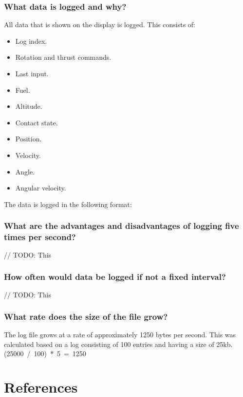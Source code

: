 \documentclass{article}
\begin{document}
{        \subsubsection{What data is logged and why?}
        All data that is shown on the display is logged. This consists of:
        \begin{itemize}
            \item Log index.
            \item Rotation and thrust commands.
            \item Last input.
            \item Fuel.
            \item Altitude.
            \item Contact state.
            \item Position.
            \item Velocity.
            \item Angle.
            \item Angular velocity.
        \end{itemize}

        The data is logged in the following format:
        

        \subsubsection{What are the advantages and disadvantages of logging five times per second?}
        // TODO: This

        \subsubsection{How often would data be logged if not a fixed interval?}
        // TODO: This

        \subsubsection{{What rate does the size of the file grow?}}
        The log file grows at a rate of approximately 1250 bytes per second.
        This was calculated based on a log consisting of 100 entries and having
        a size of 25kb. \mbox{(25000 / 100) * 5 = 1250}
}

\section*{References}
\end{document}

